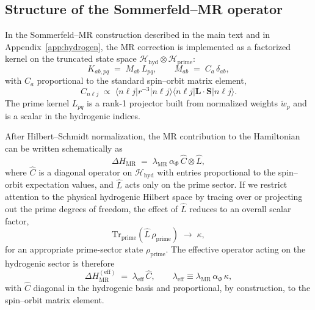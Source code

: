 \documentclass[11pt,a4paper]{article}
\newcommand{\DeltaHM}{\Delta H_{\mathrm{MR}}}
\newcommand{\lamMR}{\lambda_{\mathrm{MR}}}
\begin{document}
\subsection{Structure of the Sommerfeld--MR operator}

In the Sommerfeld--MR construction described in the main text and in
Appendix~\ref{app:hydrogen}, the MR correction is implemented as a
factorized kernel on the truncated state space
$\mathcal{H}_{\text{hyd}} \otimes \mathcal{H}_{\text{prime}}$:
\begin{equation}
  K_{ab,pq} \;=\; M_{ab}\,L_{pq},
  \qquad
  M_{ab} \;=\; C_a\,\delta_{ab},
\end{equation}
with $C_a$ proportional to the standard spin--orbit matrix element,
\begin{equation}
  C_{n\ell j}
  \;\propto\;
  \big\langle n\ell j \big| r^{-3} \big| n\ell j \big\rangle
  \big\langle n\ell j \big| \mathbf{L}\cdot\mathbf{S}
  \big| n\ell j \big\rangle.
\end{equation}
The prime kernel $L_{pq}$ is a rank-1 projector built from normalized
weights $\tilde{w}_p$ and is a scalar in the hydrogenic indices.

After Hilbert--Schmidt normalization, the MR contribution to the
Hamiltonian can be written schematically as
\begin{equation}
  \DeltaHM
  \;=\;
  \lamMR \,\alpha_\Phi\, \hat{C} \otimes \hat{L},
\end{equation}
where $\hat{C}$ is a diagonal operator on $\mathcal{H}_{\text{hyd}}$
with entries proportional to the spin--orbit expectation values, and
$\hat{L}$ acts only on the prime sector. If we restrict attention to the
physical hydrogenic Hilbert space by tracing over or projecting out the
prime degrees of freedom, the effect of $\hat{L}$ reduces to an overall
scalar factor,
\begin{equation}
  \mathrm{Tr}_{\text{prime}}(\hat{L}\,\rho_{\text{prime}}) \;\to\; \kappa,
\end{equation}
for an appropriate prime-sector state $\rho_{\text{prime}}$. The
effective operator acting on the hydrogenic sector is therefore
\begin{equation}
  \DeltaHM^{(\text{eff})}
  \;=\;
  \lambda_{\mathrm{eff}} \,\hat{C},
  \qquad
  \lambda_{\mathrm{eff}} \equiv \lamMR \,\alpha_\Phi\,\kappa,
\end{equation}
with $\hat{C}$ diagonal in the hydrogenic basis and proportional, by
construction, to the spin--orbit matrix element.
\end{document}

